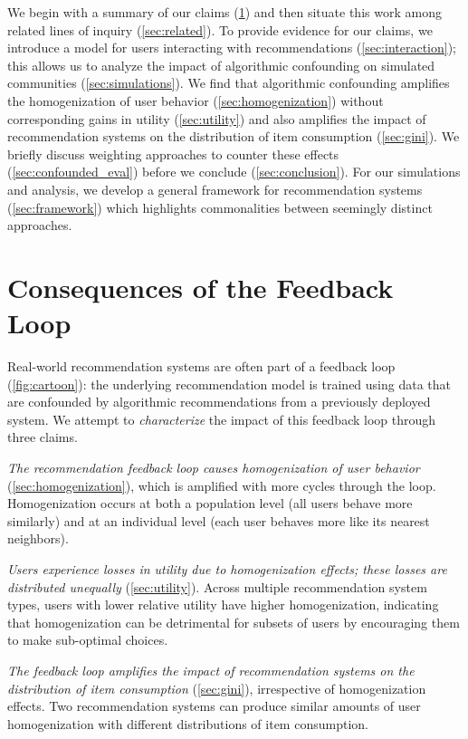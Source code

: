\documentclass[sigconf]{acmart}
\begin{document}
We begin with a summary of our claims (\cref{sec:claims}) and then situate this work among related lines of inquiry (\cref{sec:related}).
To provide evidence for our claims, we introduce a model for users interacting with recommendations (\cref{sec:interaction}); this allows us to analyze the impact of algorithmic confounding on simulated communities (\cref{sec:simulations}).
We find that algorithmic confounding amplifies the homogenization of user behavior (\cref{sec:homogenization}) without corresponding gains in utility (\cref{sec:utility}) and also amplifies the impact of recommendation systems on the distribution of item consumption (\cref{sec:gini}).
We briefly discuss weighting approaches to counter these effects (\cref{sec:confounded_eval}) before we conclude (\cref{sec:conclusion}).  For our simulations and analysis, we develop a general framework for recommendation systems (\cref{sec:framework}) which highlights commonalities between seemingly distinct approaches. 

\section{Consequences of the Feedback Loop}
\label{sec:claims}
Real-world recommendation systems are often part of a feedback loop (\cref{fig:cartoon}): the underlying recommendation model is trained using data that are confounded by algorithmic recommendations from a previously deployed system.  
We attempt to \emph{characterize} the impact of this feedback loop through three claims.

\vspace{5pt}
\textit{The recommendation feedback loop causes homogenization of user behavior} (\cref{sec:homogenization}), which is amplified with more cycles through the loop.  Homogenization occurs at both a population level (all users behave more similarly) and at an individual level (each user behaves more like its nearest neighbors).

\vspace{5pt}
\textit{Users experience losses in utility due to homogenization effects; these losses are distributed unequally} (\cref{sec:utility}).  Across multiple recommendation system types, users with lower relative utility have higher homogenization, indicating that homogenization can be detrimental for subsets of users by encouraging them to make sub-optimal choices.

\vspace{5pt}
\textit{The feedback loop amplifies the impact of recommendation systems on the distribution of item consumption} (\cref{sec:gini}), irrespective of homogenization effects. Two recommendation systems can produce similar amounts of user homogenization with different distributions of item consumption.
\end{document}
